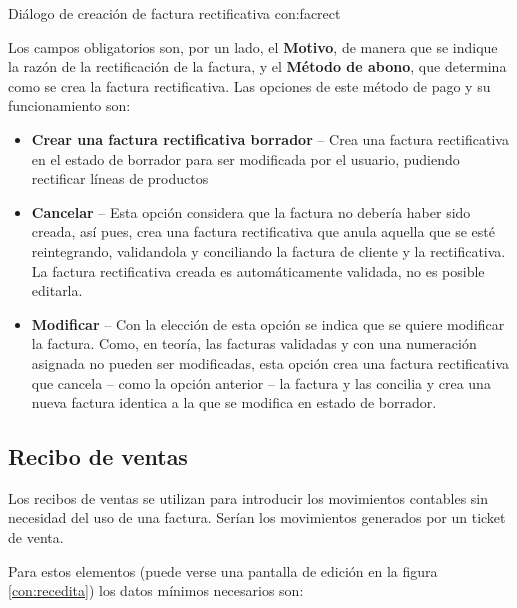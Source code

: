 {Diálogo de creación de factura rectificativa}
{con:facrect}

Los campos obligatorios son, por un lado, el \textbf{Motivo}, de manera que se indique la razón de la rectificación de la factura, y el \textbf{Método de abono}, que determina como se crea la factura rectificativa. Las opciones de este método de pago y su funcionamiento son:

\begin{itemize}
  \item \textbf{Crear una factura rectificativa borrador} -- Crea una factura rectificativa en el estado de borrador para ser modificada por el
            usuario, pudiendo rectificar líneas de productos
  \item \textbf{Cancelar} -- Esta opción considera que la factura no debería haber sido creada, así pues, crea una factura rectificativa que
            anula aquella que se esté reintegrando, validandola y conciliando la factura de cliente y la rectificativa. La factura 
            rectificativa creada es automáticamente validada, no es posible editarla.
  \item \textbf{Modificar} -- Con la elección de esta opción se indica que se quiere modificar la factura. Como, en teoría, las facturas
            validadas y con una numeración asignada no pueden ser modificadas, esta opción crea una factura rectificativa que cancela -- 
            como la opción anterior -- la factura y las concilia y crea una nueva factura identica a la que se modifica en estado 
            de borrador. 
\end{itemize}






\subsection{Recibo de ventas}

Los recibos de ventas se utilizan para introducir los movimientos contables sin necesidad del uso de una factura. Serían los movimientos generados por un ticket de venta. 

Para estos elementos (puede verse una pantalla de edición en la figura \ref{con:recedita}) los datos mínimos necesarios son:


